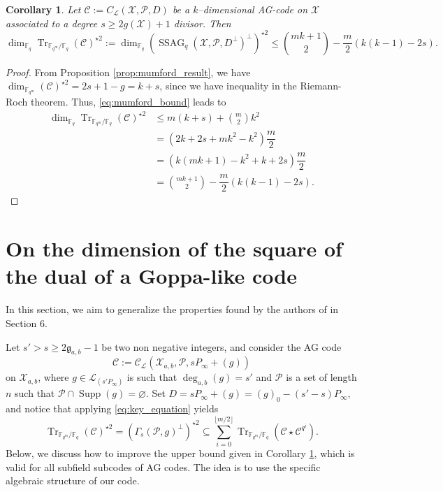 \documentclass[a4paper]{article}
\newtheorem{coro}[thm]{Corollary}
\theoremstyle{definition}
\theoremstyle{remark}
\newcommand{\calP}{\mathcal{P}}
\newcommand{\calL}{\mathcal{L}}
\newcommand{\calC}{\mathcal{C}}
\newcommand{\calX}{\mathcal{X}}
\newcommand{\fqm}{\mathbb{F}_{q^m}}
\newcommand{\fq}{\mathbb{F}_{q}}
\newcommand{\Tr}[1]{\operatorname{Tr}_{\mathbb{F}_{q^m}/\fq}\left(#1\right)}
\newcommand{\Supp}{\operatorname{Supp}}
\newcommand{\ssag}[1]{\operatorname{SSAG}_{q}\left(#1\right)}
\newcommand{\degab}[1]{\deg_{a,b}\left(#1\right)}
\begin{document}
\begin{coro} \label{coro:1st_bound_mumford}
Let $\mathcal{C} := C_{\calL}(\calX,\mathcal{P},D)$ be a $k$--dimensional AG-code on $\calX$ associated to a degree $s \geq 2g(\calX)+1$ divisor. Then
\[ \dim_{\fq}\Tr{\calC}^{\star2} := \dim_{\fq} (\ssag{\calX,\calP,D^{\perp}}^{\perp})^{\star2}  \leq \binom{mk+1}{2} - \dfrac{m}{2} (k(k-1)-2s).\]
\end{coro}


\begin{proof}
From Proposition \ref{prop:mumford_result}, we have $\dim_{\fqm}(\calC)^{\star2} = 2s+1-g = k+s$, since we have inequality in the Riemann-Roch theorem. Thus, \eqref{eq:mumford_bound} leads to
\begin{align*}
   \dim_{\fq}\Tr{\calC}^{\star2} &\leq m(k+s) + \binom{m}{2}k^2 \\
                                       &= (2k+2s+mk^2-k^2) \dfrac{m}{2} \\
                                       &= (k(mk+1)-k^2+k+2s) \dfrac{m}{2} \\
                                       &= \binom{mk+1}{2} - \dfrac{m}{2}(k(k-1)-2s) .
\end{align*}
\end{proof}


\section{On the dimension of the square of the dual of a Goppa-like code}

In this section, we aim to generalize the properties found by the authors of \cite{MT21} in Section 6. 

\noindent Let $s' > s \geq 2\mathfrak{g}_{a,b}-1$ be two non negative integers, and consider the AG code 
$$\calC := \calC_{\calL}(\calX_{a,b},\calP,sP_\infty+(g))$$
on $\calX_{a,b}$, where $g \in \calL_(s'P_\infty)$ is such that $\degab{g} = s'$ and $\calP$ is a set of length $n$ such that $\calP \cap \Supp(g) = \varnothing$. 
\noindent Set $D=sP_\infty+(g)=(g)_0-(s'-s)P_\infty$, and notice that applying \eqref{eq:key_equation} yields   
$$ \Tr{\calC}^{\star 2} = (\Gamma_s(\calP,g)^{\perp})^{\star2} \subseteq \sum\limits_{i=0}^{\lfloor{m/2} \rfloor} \Tr{\calC\star \calC^{q^i}}.$$ 
Below, we discuss how to improve the upper bound given in Corollary \ref{coro:1st_bound_mumford}, which is valid for all subfield subcodes of AG codes. The idea is to use the specific algebraic structure of our code.
\end{document}
